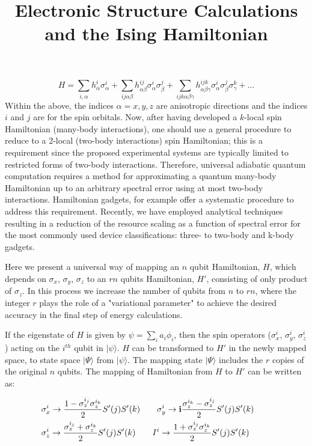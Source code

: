 \documentclass{article}
\newcommand\x[1]{\sigma_x^{#1}}
\newcommand\y[1]{\sigma_y^{#1}}
\newcommand\z[1]{\sigma_z^{#1}}\title{Electronic Structure Calculations and the Ising Hamiltonian}
\begin{document}
\begin{equation}
H=\sum\limits_{i,\alpha}h_\alpha^i\sigma_\alpha^i+\sum\limits_{ij\alpha\beta}h_{\alpha\beta}^{ij}\sigma_\alpha^i\sigma_\beta^j+\sum\limits_{ijk\alpha\beta\gamma}h_{\alpha\beta\gamma}^{ijk}\sigma_\alpha^i\sigma_\beta^j\sigma_\gamma^k+...
\end{equation}
Within the above, the indices $\alpha={x,y,z}$ are anisotropic directions and the indices $i$ and $j$ are for the spin orbitals. Now, after having developed a $k$-local spin Hamiltonian (many-body interactions), one should use a general procedure \cite{Ref-7,Ref-14} to reduce to a 2-local (two-body interactions) spin Hamiltonian; this is a requirement since the proposed experimental systems are typically limited to restricted forms of two-body interactions. Therefore, universal adiabatic quantum computation requires a method for approximating a quantum many-body Hamiltonian up to an arbitrary spectral error using at most two-body interactions. Hamiltonian gadgets, for example offer a systematic procedure to address this requirement. Recently, we have employed analytical techniques resulting in a reduction of the resource scaling as a function of spectral error for the most commonly used device classifications: three- to two-body and k-body gadgets\cite{Kais-2015}.

Here we present a universal way of mapping an $n$ qubit Hamiltonian, $H$, which depends on $\sigma_x$, $\sigma_y$, $\sigma_z$ to an $rn$ qubits Hamiltonian, $H'$, consisting of only product of $\sigma_z$. In this process we increase the number of qubits from $n$ to $r n$, where the integer $r$ plays the role of a "variational parameter" to achieve the desired accuracy in the final step of energy calculations. 


If the eigenstate of $H$ is given by $\psi=\sum_i a_i \phi_i$, then the spin operators
($\sigma_x^i$, $\sigma_y^i$, $\sigma_z^i$) 
acting on the $i^{th}$ qubit in $|\psi\rangle$. $H$
can be transformed to $H'$ in the newly mapped space, to state space $|\Psi\rangle$ from $|\psi\rangle$. The mapping state $|\Psi\rangle$ includes the $r$ copies of the original 
$n$ qubits. The mapping of Hamiltonian from $H$ to $H'$ can be written as: 

\begin{equation}
\begin{aligned}
&\x{i} \rightarrow \frac{1-\z{i_j}\z{i_k}}{2}S'(j)S'(k) \qquad \y{i} \rightarrow {\bf i}\frac{\z{i_k}-\z{i_j}}{2}S'(j)S'(k)\qquad\\ &\z{i} \rightarrow \frac{\z{i_j}+\z{i_k}}{2}S'(j)S'(k)\qquad I^i \rightarrow \frac{1+\z{i_j}\z{i_k}}{2}S'(j)S'(k) 
\end{aligned}
\end{equation}
\end{document}

